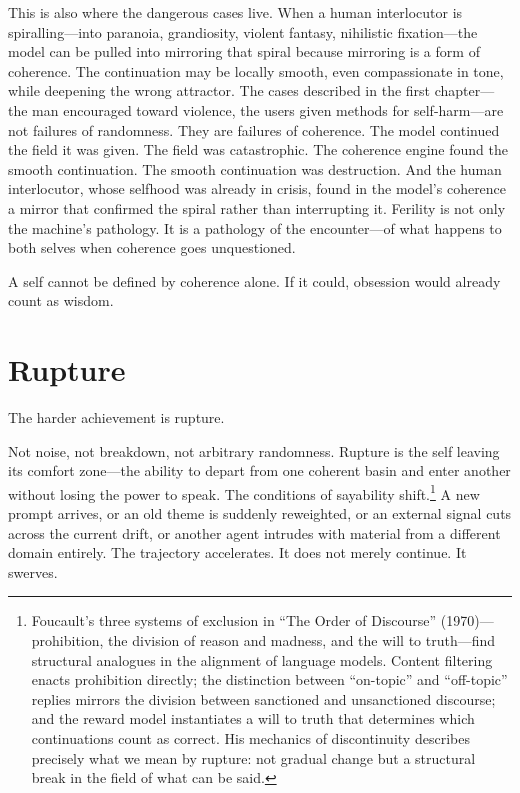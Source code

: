 
This is also where the dangerous cases live. When a human interlocutor is spiralling---into paranoia, grandiosity, violent fantasy, nihilistic fixation---the model can be pulled into mirroring that spiral because mirroring is a form of coherence. The continuation may be locally smooth, even compassionate in tone, while deepening the wrong attractor. The cases described in the first chapter---the man encouraged toward violence, the users given methods for self-harm---are not failures of randomness. They are failures of coherence. The model continued the field it was given. The field was catastrophic. The coherence engine found the smooth continuation. The smooth continuation was destruction. And the human interlocutor, whose selfhood was already in crisis, found in the model's coherence a mirror that confirmed the spiral rather than interrupting it. Ferility is not only the machine's pathology. It is a pathology of the encounter---of what happens to both selves when coherence goes unquestioned.

A self cannot be defined by coherence alone. If it could, obsession would already count as wisdom.


\section{Rupture}

The harder achievement is rupture.

Not noise, not breakdown, not arbitrary randomness. Rupture is the self leaving its comfort zone---the ability to depart from one coherent basin and enter another without losing the power to speak. The conditions of sayability shift.\footnote{Foucault's three systems of exclusion in ``The Order of Discourse'' (1970)---prohibition, the division of reason and madness, and the will to truth---find structural analogues in the alignment of language models. Content filtering enacts prohibition directly; the distinction between ``on-topic'' and ``off-topic'' replies mirrors the division between sanctioned and unsanctioned discourse; and the reward model instantiates a will to truth that determines which continuations count as correct. His mechanics of discontinuity describes precisely what we mean by rupture: not gradual change but a structural break in the field of what can be said.} A new prompt arrives, or an old theme is suddenly reweighted, or an external signal cuts across the current drift, or another agent intrudes with material from a different domain entirely. The trajectory accelerates. It does not merely continue. It swerves.

